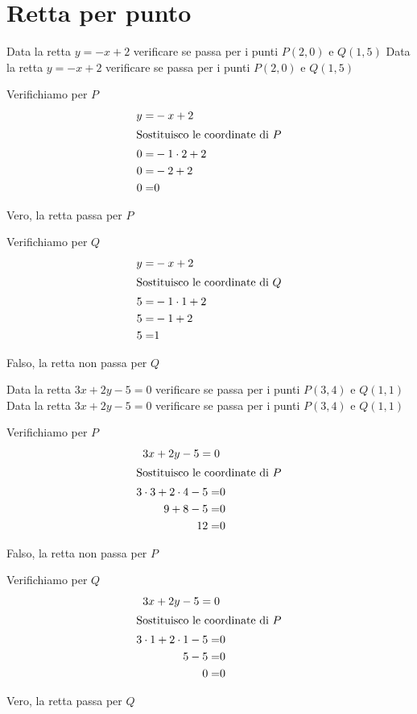 \section{Retta per punto}
\begin{exercise}
	Data la retta $y=-x+2$ verificare se passa per i punti $P(2,0)$ e $Q(1,5)$
	\tcblower
	Data la retta $y=-x+2$ verificare se passa per i punti $P(2,0)$ e $Q(1,5)$
	
	Verifichiamo per $P$
	\begin{align*}
		y=&-x+2\\
		\intertext{Sostituisco le coordinate di $P$}
		0=&-1\cdot 2+2\\
		0=&-2+2\\
		0=&0\\
	\end{align*}
	
	Vero, la retta passa per $P$
	
		Verifichiamo per $Q$
	\begin{align*}
		y=&-x+2\\
		\intertext{Sostituisco le coordinate di $Q$}
		5=&-1\cdot 1+2\\
		5=&-1+2\\
		5=&1\\
	\end{align*}
	
	Falso, la retta non passa per $Q$
\end{exercise}
\begin{exercise}
	Data la retta $3x+2y-5=0$ verificare se passa per i punti $P(3,4)$ e $Q(1,1)$
	\tcblower
	Data la retta $3x+2y-5=0$ verificare se passa per i punti $P(3,4)$ e $Q(1,1)$
	
	Verifichiamo per $P$
	\begin{align*}
		3x+2y-5=0\\
		\intertext{Sostituisco le coordinate di $P$}
		3\cdot 3+2\cdot 4-5=&0\\
		9+8-5=&0\\
		12=&0\\
	\end{align*}
	
	Falso, la retta non passa per $P$
	
	Verifichiamo per $Q$
	\begin{align*}
		3x+2y-5=0\\
		\intertext{Sostituisco le coordinate di $P$}
		3\cdot 1+2\cdot 1-5=&0\\
		5-5=&0\\
		0=&0\\
	\end{align*}
	
	Vero, la retta passa per $Q$
\end{exercise}
